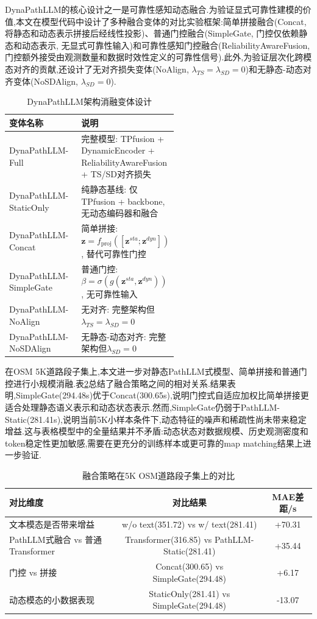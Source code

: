 \documentclass{rjthesis}
\begin{document}
DynaPathLLM的核心设计之一是可靠性感知动态融合.为验证显式可靠性建模的价值,本文在模型代码中设计了多种融合变体的对比实验框架:简单拼接融合(Concat, 将静态和动态表示拼接后经线性投影)、普通门控融合(SimpleGate, 门控仅依赖静态和动态表示, 无显式可靠性输入)和可靠性感知门控融合(ReliabilityAwareFusion, 门控额外接受由观测数量和数据时效性定义的可靠性信号).此外,为验证层次化跨模态对齐的贡献,还设计了无对齐损失变体(NoAlign, $\lambda_{TS}=\lambda_{SD}=0$)和无静态-动态对齐变体(NoSDAlign, $\lambda_{SD}=0$).

\begin{table}[htbp]
	\centering
	\caption{DynaPathLLM架构消融变体设计}
	\label{tab:variant_design}
	\begin{tabular}{lp{0.55\linewidth}}
		\toprule
		变体名称 & 说明 \\
		\midrule
		DynaPathLLM-Full & 完整模型: TPfusion + DynamicEncoder + ReliabilityAwareFusion + TS/SD对齐损失 \\
		DynaPathLLM-StaticOnly & 纯静态基线: 仅TPfusion + backbone, 无动态编码器和融合 \\
		DynaPathLLM-Concat & 简单拼接: $\mathbf{z}=f_{\text{proj}}([\mathbf{z}^{sta};\mathbf{z}^{dyn}])$, 替代可靠性门控 \\
		DynaPathLLM-SimpleGate & 普通门控: $\beta=\sigma(g(\mathbf{z}^{sta},\mathbf{z}^{dyn}))$, 无可靠性输入 \\
		DynaPathLLM-NoAlign & 无对齐: 完整架构但$\lambda_{TS}=\lambda_{SD}=0$ \\
		DynaPathLLM-NoSDAlign & 无静态-动态对齐: 完整架构但$\lambda_{SD}=0$ \\
		\bottomrule
	\end{tabular}
\end{table}

在OSM 5K道路段子集上,本文进一步对静态PathLLM式模型、简单拼接和普通门控进行小规模消融.表\ref{tab:fusion_summary}总结了融合策略之间的相对关系.结果表明,SimpleGate(294.48s)优于Concat(300.65s),说明门控式自适应加权比简单拼接更适合处理静态语义表示和动态状态表示.然而,SimpleGate仍弱于PathLLM-Static(281.41s),说明当前5K小样本条件下,动态特征的噪声和稀疏性尚未带来稳定增益.这与表格模型中的全量结果并不矛盾:动态状态对数据规模、历史观测密度和token稳定性更加敏感,需要在更充分的训练样本或更可靠的map matching结果上进一步验证.

\begin{table}[htbp]
	\centering
	\caption{融合策略在5K OSM道路段子集上的对比}
	\label{tab:fusion_summary}
	\begin{tabular}{lcc}
		\toprule
		对比维度 & 对比结果 & MAE差距/s \\
		\midrule
		文本模态是否带来增益 & w/o text(351.72) vs w/ text(281.41) & +70.31 \\
		PathLLM式融合 vs 普通Transformer & Transformer(316.85) vs PathLLM-Static(281.41) & +35.44 \\
		门控 vs 拼接 & Concat(300.65) vs SimpleGate(294.48) & +6.17 \\
		动态模态的小数据表现 & StaticOnly(281.41) vs SimpleGate(294.48) & -13.07 \\
		\bottomrule
	\end{tabular}
\end{table}
\end{document}
